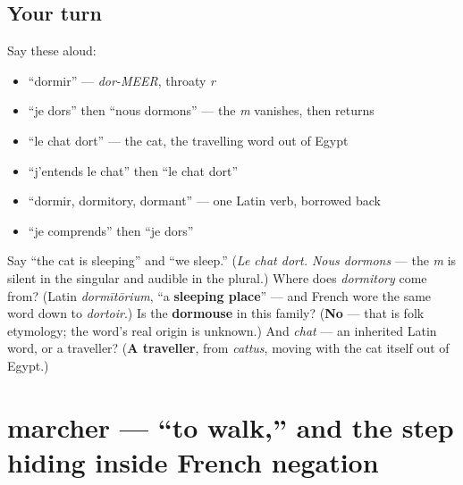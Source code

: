 \subsection*{Your turn}
Say these aloud:

\begin{itemize}
\raggedright
  \item \textquotedblleft{}dormir\textquotedblright{} — \emph{dor-MEER}, throaty \emph{r}
  \item \textquotedblleft{}je dors\textquotedblright{} then \textquotedblleft{}nous dormons\textquotedblright{} — the \emph{m} vanishes, then returns
  \item \textquotedblleft{}le chat dort\textquotedblright{} — the cat, the travelling word out of Egypt
  \item \textquotedblleft{}j'entends le chat\textquotedblright{} then \textquotedblleft{}le chat dort\textquotedblright{}
  \item \textquotedblleft{}dormir, dormitory, dormant\textquotedblright{} — one Latin verb, borrowed back
  \item \textquotedblleft{}je comprends\textquotedblright{} then \textquotedblleft{}je dors\textquotedblright{}
\end{itemize}

\begin{tcolorbox}[breakable,colback=teal!4,colframe=teal!35!black,title={Before you move on}]
Say \textquotedblleft{}the cat is sleeping\textquotedblright{} and \textquotedblleft{}we sleep.\textquotedblright{} (\emph{Le chat dort. Nous dormons} — the \emph{m} is silent in the singular and audible in the plural.) Where does \emph{dormitory} come from? (Latin \emph{dormītōrium}, \textquotedblleft{}a \textbf{sleeping place}\textquotedblright{} — and French wore the same word down to \emph{dortoir}.) Is the \textbf{dormouse} in this family? (\textbf{No} — that is folk etymology; the word's real origin is unknown.) And \emph{chat} — an inherited Latin word, or a traveller? (\textbf{A traveller}, from \emph{cattus}, moving with the cat itself out of Egypt.)
\end{tcolorbox}
\section[marcher]{marcher — \textquotedblleft{}to walk,\textquotedblright{} and the step hiding inside French negation}

\label{lesson:FR-C26-marcher}



